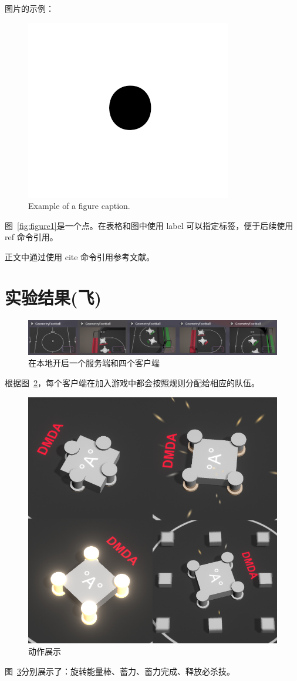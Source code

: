 \documentclass[conference]{IEEEtran}
\begin{document}
图片的示例：
\begin{figure}[htbp]
\centerline{\includegraphics{images/fig1.png}}
\caption{Example of a figure caption.}
\label{fig:figure-1}
\end{figure}
图~\ref{fig:figure1}是一个点。在表格和图中使用 label 可以指定标签，便于后续使用 ref 命令引用。


正文中通过使用 cite 命令引用参考文献。

\newpage
\section{实验结果(飞)}

\begin{figure}[htbp]
  \centerline{\includegraphics[width=.46\textwidth]{images/result1.png}}
  \caption{在本地开启一个服务端和四个客户端}
  \label{fig:result1}
\end{figure}
  根据图~\ref{fig:result1}，每个客户端在加入游戏中都会按照规则分配给相应的队伍。

  \begin{figure}[htbp]
    \centerline{\includegraphics[width=.32\textwidth]{images/result2.png}}
    \caption{动作展示}
    \label{fig:result2}
  \end{figure}
  图~\ref{fig:result2}分别展示了：旋转能量棒、蓄力、蓄力完成、释放必杀技。
\end{document}
